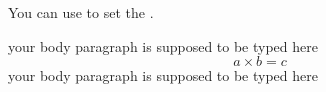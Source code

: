 \begin{frame}[fragile]
You can use \LC{\setlength} to set the . \medskip
	
\begin{command}
\begin{LCL}
\setlength{}
\setlength{}
\end{LCL}
\end{command}

\begin{latexexample}
\setlength\abovedisplayskip{0em}
\setlength\belowdisplayskip{0em}
your body paragraph is supposed to be typed here
\begin{equation}
  a \times b = c 
\end{equation}
your body paragraph is supposed to be typed here
\end{latexexample}

\end{frame}





